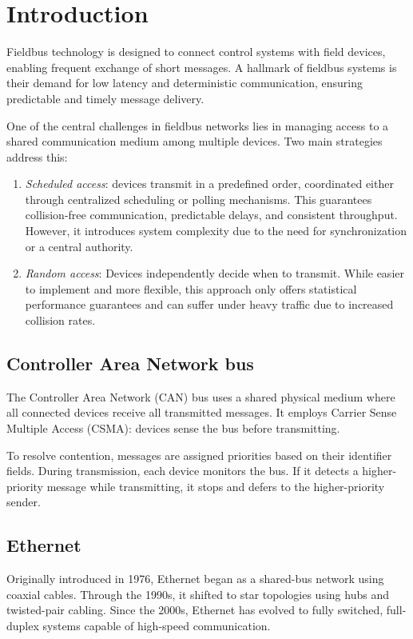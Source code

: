 \section{Introduction}

Fieldbus technology is designed to connect control systems with field devices, enabling frequent exchange of short messages.
A hallmark of fieldbus systems is their demand for low latency and deterministic communication, ensuring predictable and timely message delivery.

One of the central challenges in fieldbus networks lies in managing access to a shared communication medium among multiple devices. 
Two main strategies address this:
\begin{enumerate}
    \item \textit{Scheduled access}: devices transmit in a predefined order, coordinated either through centralized scheduling or polling mechanisms. 
        This guarantees collision-free communication, predictable delays, and consistent throughput. 
        However, it introduces system complexity due to the need for synchronization or a central authority.
    \item \textit{Random access}: Devices independently decide when to transmit. 
        While easier to implement and more flexible, this approach only offers statistical performance guarantees and can suffer under heavy traffic due to increased collision rates.
\end{enumerate}

\subsection{Controller Area Network bus}
The Controller Area Network (CAN) bus uses a shared physical medium where all connected devices receive all transmitted messages. 
It employs Carrier Sense Multiple Access (CSMA): devices sense the bus before transmitting. 

To resolve contention, messages are assigned priorities based on their identifier fields.
During transmission, each device monitors the bus. 
If it detects a higher-priority message while transmitting, it stops and defers to the higher-priority sender.

\subsection{Ethernet}
Originally introduced in 1976, Ethernet began as a shared-bus network using coaxial cables.
Through the 1990s, it shifted to star topologies using hubs and twisted-pair cabling. 
Since the 2000s, Ethernet has evolved to fully switched, full-duplex systems capable of high-speed communication.

